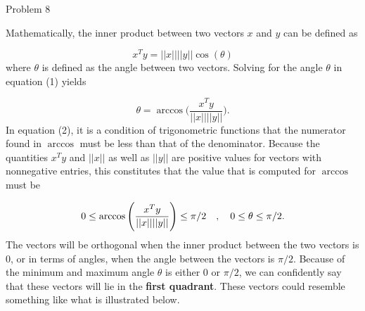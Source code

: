 \begin{problem}{Problem 8}
\begin{highlight}[Solution]
        Mathematically, the inner product between two vectors $x$ and $y$ can be defined as

        \setcounter{equation}{0}
        \begin{equation}
            x^{T}y = ||x||||y||\cos{(\theta)}
        \end{equation}
        where $\theta$ is defined as the angle between two vectors. Solving for the angle $\theta$ in equation (1) yields 

        \begin{equation}
            \theta = \arccos{\Bigg(\frac{x^{T}y}{||x||||y||}\Bigg)}.
        \end{equation}
        In equation (2), it is a condition of trigonometric functions that the numerator found in $\arccos$ must be less than that of the denominator. Because the quantities $x^{T}y$ and $||x||$ as 
        well as $||y||$ are positive values for vectors with nonnegative entries, this constitutes that the value that is computed for $\arccos$ must be

        \begin{equation}
            0 \leq \arccos{\Bigg(\frac{x^{T}y}{||x||||y||}\Bigg)} \leq \pi / 2 \hspace*{10pt} , \hspace*{10pt} 0 \leq \theta \leq \pi / 2.
        \end{equation}
        The vectors will be orthogonal when the inner product between the two vectors is 0, or in terms of angles, when the angle between the vectors is $\pi / 2$. Because of the minimum and maximum angle 
        $\theta$ is either 0 or $\pi / 2$, we can confidently say that these vectors will lie in the \textbf{first quadrant}. These vectors could resemble something like what is illustrated below.


\end{highlight}
\end{problem}
